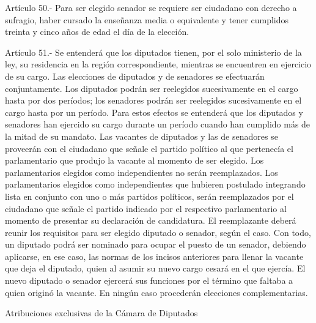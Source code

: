     Artículo 50.- Para ser elegido senador se requiere ser ciudadano con derecho a sufragio, haber cursado la enseñanza media o equivalente y tener cumplidos treinta y cinco años de edad el día de la elección.



    Artículo 51.- Se entenderá que los diputados tienen, por el solo ministerio de la ley, su residencia en la región correspondiente, mientras se encuentren en ejercicio de su cargo.
    Las elecciones de diputados y de senadores se efectuarán conjuntamente.
    Los diputados podrán ser reelegidos sucesivamente en el cargo hasta por dos períodos; los senadores podrán ser reelegidos sucesivamente en el cargo hasta por un período. Para estos efectos se entenderá que los diputados y senadores han ejercido su cargo durante un período cuando han cumplido más de la mitad de su mandato.
    Las vacantes de diputados y las de senadores se proveerán con el ciudadano que señale el partido político al que pertenecía el parlamentario que produjo la vacante al momento de ser elegido.
    Los parlamentarios elegidos como independientes no serán reemplazados.
    Los parlamentarios elegidos como independientes que hubieren postulado integrando lista en conjunto con uno o más partidos políticos, serán reemplazados por el ciudadano que señale el partido indicado por el respectivo parlamentario al momento de presentar su declaración de candidatura.
    El reemplazante deberá reunir los requisitos para ser elegido diputado o senador, según el caso. Con todo, un diputado podrá ser nominado para ocupar el puesto de un senador, debiendo aplicarse, en ese caso, las normas de los incisos anteriores para llenar la vacante que deja el diputado, quien al asumir su nuevo cargo cesará en el que ejercía.
    El nuevo diputado o senador ejercerá sus funciones por el término que faltaba a quien originó la vacante.
    En ningún caso procederán elecciones complementarias.




    Atribuciones exclusivas de la Cámara de Diputados



